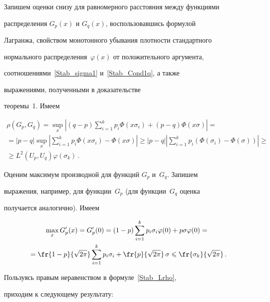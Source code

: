 Запишем оценки снизу для равномерного расстояния между функциями

распределения $G_p(x)$ и $G_q(x)$, воспользовавшись формулой

Лагранжа, свойством монотонного убывания плотности стандартного

нормального распределения~$\varphi(x)$ от положительного аргумента,

соотношениями~\eqref{Stab_sigma1} и~\eqref{Stab_Cond1q}, а также

выражениями, полученными в доказательстве

теоремы~1. Имеем

\begin{multline*}

\rho(G_p,G_q)=\sup\limits_x|(q-p)\sum\limits_{i=1}^k

p_i\Phi(x\sigma_i)+(p-q)\Phi(x\sigma)|={}\\

{}=|p-q|\sup\limits_x\left|\sum\limits_{i=1}^k

p_i\Phi(x\sigma_i)-\Phi(x\sigma)\right|\geqslant|p-q|\left|\sum\limits_{i=1}^k

p_i(\Phi(\sigma_i)-\Phi(\sigma))\right|\geqslant{}\\

{}\geqslant L^2(U_p,U_q)\varphi(\sigma_k)\,.

\end{multline*}



Оценим максимум производной для функций $G_p$ и~$G_q$. Запишем

выражения, например, для функции~$G_p$ (для функции~$G_q$ оценка

получается аналогично). Имеем

\begin{multline*}

\max\limits_x G_p'(x)=G_p'(0)=(1-p)\sum\limits_{i=1}^k

p_i\sigma_i\varphi(0)+p\sigma\varphi(0)={}\\

{}=\fr{1-p}{\sqrt{2\pi}}\sum\limits_{i=1}^k

p_i\sigma_i+\fr{p}{\sqrt{2\pi}}\,\sigma\leqslant\fr{\sigma_k}{\sqrt{2\pi}}\,.

\end{multline*}



Пользуясь правым неравенством в формуле~\eqref{Stab_Lrho},

приходим к следующему результату:

